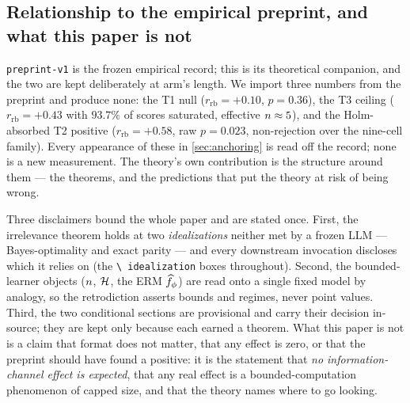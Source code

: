 \subsection{Relationship to the empirical preprint, and what this paper is not}
\label{subsec:intro-companion}

\texttt{preprint-v1} is the frozen empirical record; this is its theoretical
companion, and the two are kept deliberately at arm's length. We import three
numbers from the preprint and produce none: the T1 null
($r_{\mathrm{rb}}=+0.10$, $p=0.36$), the T3 ceiling ($r_{\mathrm{rb}}=+0.43$ with
$93.7\%$ of scores saturated, effective $n\approx5$), and the
Holm-absorbed T2 positive ($r_{\mathrm{rb}}=+0.58$, raw $p=0.023$, non-rejection
over the nine-cell family). Every appearance of these in \cref{sec:anchoring} is
read off the record; none is a new measurement. The theory's own contribution is
the structure around them --- the theorems, and the predictions that put the
theory at risk of being wrong.

Three disclaimers bound the whole paper and are stated once. First, the
irrelevance theorem holds at two \emph{idealizations} neither met by a frozen
LLM --- Bayes-optimality and exact parity --- and every downstream invocation
discloses which it relies on (the \texttt{\textbackslash
idealization} boxes throughout). Second, the bounded-learner objects
($n$, $\mathcal{H}$, the ERM $\widehat f_{\phi}$) are read onto a single
fixed model by analogy, so the retrodiction asserts bounds and regimes, never
point values. Third, the two conditional sections are provisional and
carry their decision in-source; they are kept only because each earned a theorem.
What this paper is not is a claim that format does not matter, that any effect is
zero, or that the preprint should have found a positive: it is the statement that
\emph{no information-channel effect is expected}, that any real effect is a
bounded-computation phenomenon of capped size, and that the theory names where to
go looking.
